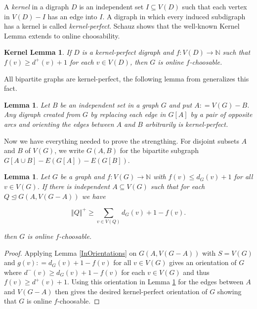 \documentclass[12pt]{article}
\theoremstyle{plain}
\newtheorem{lem}[thm]{Lemma}
\newtheorem*{KernelLemma}{Kernel Lemma}
\theoremstyle{definition}
\theoremstyle{remark}
\newcommand{\IN}{\mathbb{N}}
\newcommand{\size}[1]{\left\Vert#1\right\Vert}
\newcommand{\func}[3]{#1\colon #2 \rightarrow #3}
\newcommand{\DefinedAs}{\mathrel{\mathop:}=}
\begin{document}
A \emph{kernel} in a digraph $D$ is an independent set $I \subseteq V(D)$ such that each vertex in $V(D) - I$ has an edge into $I$.  A digraph in which every induced subdigraph has a kernel is called \emph{kernel-perfect}.  Schauz \cite{schauz2009mr} shows that the well-known Kernel Lemma extends to online choosability.

\begin{KernelLemma}
If $D$ is a kernel-perfect digraph and $\func{f}{V(D)}{\IN}$ such that $f(v) \geq d^+(v) + 1$ for each $v \in V(D)$, then $G$ is online $f$-choosable.
\end{KernelLemma}

All bipartite graphs are kernel-perfect, the following lemma from \cite{kostochkayancey2012ore} generalizes this fact.

\begin{lem}\label{KernelPerfect}
Let $B$ be an independent set in a graph $G$ and put $A \DefinedAs V(G) - B$.  Any digraph created from $G$ by replacing each edge in $G[A]$ by a pair of opposite arcs and orienting the edges between $A$ and $B$ arbitrarily is kernel-perfect.
\end{lem}

Now we have everything needed to prove the strengthing.  For disjoint subsets $A$ and $B$ of $V(G)$, we write $G(A, B)$ for the bipartite subgraph $G[A \cup B] - E(G[A]) - E(G[B])$.  

\begin{lem}\label{MicStrength}
Let $G$ be a graph and $\func{f}{V(G)}{\IN}$ with $f(v) \leq d_G(v) + 1$ for all $v \in V(G)$.  If there is independent $A \subseteq V(G)$ such that for each $Q \unlhd G(A, V(G-A))$ we have

\[\size{Q}^+ \geq  \sum_{v \in V(Q)} d_G(v) + 1 - f(v).\]

\noindent then $G$ is online $f$-choosable.
\end{lem}
\begin{proof}
Applying Lemma \ref{InOrientations} on $G(A, V(G-A))$ with $S = V(G)$ and $g(v) \DefinedAs d_G(v) + 1 - f(v)$ for all $v \in V(G)$ gives an orientation of $G$ where $d^-(v) \geq d_G(v) + 1 - f(v)$ for each $v \in V(G)$ and thus $f(v) \geq d^+(v) + 1$.  Using this orientation in Lemma \ref{KernelPerfect} for the edges between $A$ and $V(G-A)$ then gives the desired kernel-perfect orientation of $G$ showing that $G$ is online $f$-choosable.
\end{proof}
\end{document}
